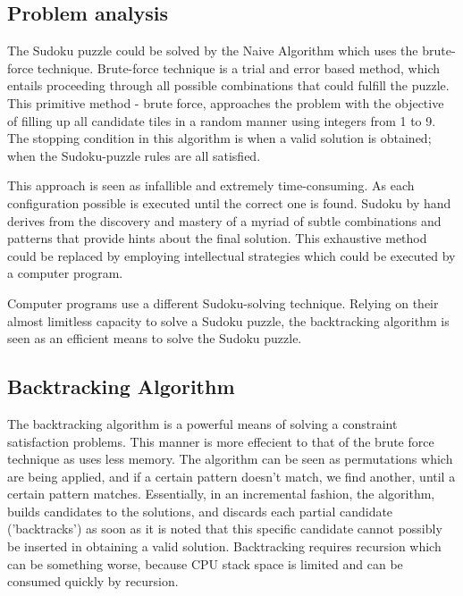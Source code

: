 \documentclass[12pt]{article}
\begin{document}
\subsection{Problem analysis}
\begin{flushleft}
The Sudoku puzzle could be solved by the Naive Algorithm which uses the brute-force technique. 
Brute-force technique is a trial and error based method, which entails proceeding through all possible combinations that could fulfill the puzzle. 
This primitive method - brute force, approaches the problem with the objective of filling up all candidate tiles in a random manner using integers from 1 to 9. The stopping condition in this algorithm is when a valid solution is obtained; when the Sudoku-puzzle rules are all satisfied. 

This approach is seen as infallible and extremely time-consuming. As each configuration possible is executed until the correct one is found. \newline
Sudoku by hand derives from the discovery and mastery of a myriad of subtle combinations and patterns that provide hints about the final solution.
This exhaustive method could be replaced by employing intellectual strategies which could be executed by a computer program. 
\newline

Computer programs use a different Sudoku-solving  technique. Relying on their almost limitless capacity to solve a Sudoku puzzle, the backtracking algorithm is seen as an efficient means to solve the Sudoku puzzle.



\end{flushleft}

\subsection{Backtracking Algorithm}
\begin{flushleft}
The backtracking algorithm is a powerful means of solving a constraint satisfaction problems. This manner is more effecient to that of the brute force technique as uses less memory.
The algorithm can be seen as permutations which are being applied, and if a certain pattern doesn't match, we find another, until a certain pattern matches.
Essentially, in an incremental fashion, the algorithm, builds candidates to the solutions, and discards each partial candidate ('backtracks') as soon as it is noted that this specific candidate cannot possibly be inserted in obtaining a valid solution. 
Backtracking requires recursion which can be something worse, because CPU stack space is limited and can be consumed quickly by recursion.
\end{flushleft}
\end{document}
